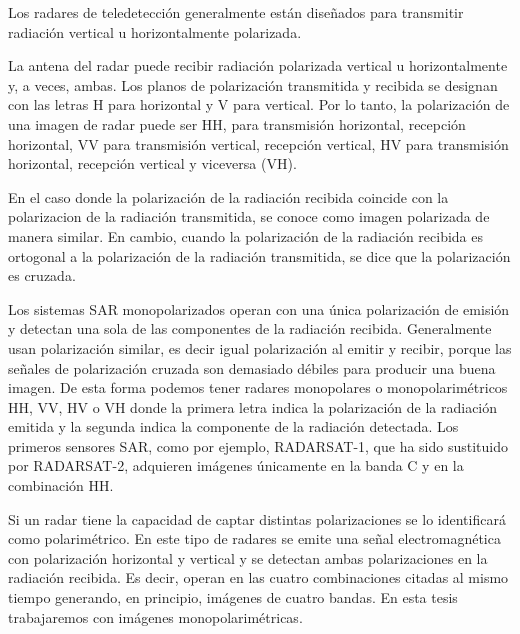 Los radares de teledetección generalmente están diseñados para transmitir radiación vertical u horizontalmente polarizada. 

La antena del radar puede recibir radiación polarizada vertical u horizontalmente y, a veces, ambas. Los planos de polarización transmitida y recibida se designan con las letras H para horizontal y V para vertical. Por lo tanto, la polarización de una imagen de radar puede ser HH, para transmisión horizontal, recepción horizontal, VV para transmisión vertical, recepción vertical, HV para transmisión horizontal, recepción vertical y viceversa (VH).

En el caso donde la polarización de la radiación recibida coincide con la polarizacion de la radiación transmitida, se conoce como imagen polarizada de manera similar. En cambio, cuando la polarización de la radiación recibida es ortogonal a la polarización de la radiación transmitida, se dice que la polarización es cruzada.  

Los sistemas SAR monopolarizados operan con una única polarización de emisión y detectan una sola de las componentes de la radiación recibida. 
Generalmente usan polarización similar, es decir igual polarización al emitir y recibir,  porque las señales de polarización cruzada son demasiado débiles para producir una buena imagen. 
De esta forma podemos tener radares monopolares o monopolarimétricos HH, VV, HV o VH donde la primera letra indica la polarización de la radiación emitida y la segunda indica la componente de la radiación detectada. 
Los primeros sensores SAR, como por ejemplo,  RADARSAT-1, que ha sido sustituido por RADARSAT-2, adquieren imágenes únicamente en la banda C y en la combinación HH. 

Si un radar tiene la capacidad de captar distintas polarizaciones se lo identificará como polarimétrico. 
En este tipo de radares se emite una señal electromagnética con polarización horizontal y vertical y se detectan ambas polarizaciones en la radiación recibida. 
Es decir, operan en las cuatro combinaciones citadas al mismo tiempo generando, en principio, imágenes de cuatro bandas. 
En esta tesis trabajaremos con imágenes monopolarimétricas.

